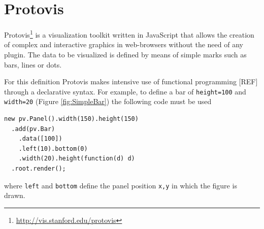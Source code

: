 \documentclass[preprint,10pt]{sigplanconf}
\newcommand{\ct}{\lstinline[backgroundcolor=\color{white},basicstyle=\footnotesize\ttfamily]}
\newcommand{\ab}[1]{\nb{Alexandre}{blue}{#1}}
\begin{document}
\section{Protovis}
Protovis\footnote{\url{http://vis.stanford.edu/protovis}} is a visualization toolkit written in JavaScript that allows the creation of complex and interactive graphics in web-browsers without the need of any plugin. The data to be visualized is defined by means of simple marks such as bars, lines or dots. 

For this definition Protovis makes intensive use of functional programming [REF] through a declarative syntax. For example, to define a bar of \ct{height=100} and \ct{width=20} (Figure \ref{fig:SimpleBar}) the following code must be used
\begin{lstlisting} 
new pv.Panel().width(150).height(150)
  .add(pv.Bar)
    .data([100])
    .left(10).bottom(0)
    .width(20).height(function(d) d)
  .root.render();
\end{lstlisting}
where \ct{left} and \ct{bottom} define the panel position \ct{x,y} in which the figure is drawn.
\end{document}
